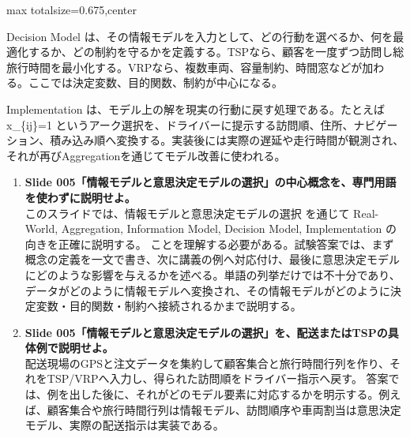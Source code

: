 \begin{adjustbox}{max totalsize={\textwidth}{0.675\textheight},center}
\begin{minipage}{\textwidth}
\begin{minipage}[t]{0.485\textwidth}
Decision Model は、その情報モデルを入力として、どの行動を選べるか、何を最適化するか、どの制約を守るかを定義する。TSPなら、顧客を一度ずつ訪問し総旅行時間を最小化する。VRPなら、複数車両、容量制約、時間窓などが加わる。ここでは決定変数、目的関数、制約が中心になる。\par
Implementation は、モデル上の解を現実の行動に戻す処理である。たとえば x\_\{ij\}=1 というアーク選択を、ドライバーに提示する訪問順、住所、ナビゲーション、積み込み順へ変換する。実装後には実際の遅延や走行時間が観測され、それが再びAggregationを通じてモデル改善に使われる。\par
{}
\begin{enumerate}
\item \textbf{Slide 005「情報モデルと意思決定モデルの選択」の中心概念を、専門用語を使わずに説明せよ。}\\このスライドでは、情報モデルと意思決定モデルの選択 を通じて Real-World, Aggregation, Information Model, Decision Model, Implementation の向きを正確に説明する。 ことを理解する必要がある。試験答案では、まず概念の定義を一文で書き、次に講義の例へ対応付け、最後に意思決定モデルにどのような影響を与えるかを述べる。単語の列挙だけでは不十分であり、データがどのように情報モデルへ変換され、その情報モデルがどのように決定変数・目的関数・制約へ接続されるかまで説明する。
\item \textbf{Slide 005「情報モデルと意思決定モデルの選択」を、配送またはTSPの具体例で説明せよ。}\\配送現場のGPSと注文データを集約して顧客集合と旅行時間行列を作り、それをTSP/VRPへ入力し、得られた訪問順をドライバー指示へ戻す。 答案では、例を出した後に、それがどのモデル要素に対応するかを明示する。例えば、顧客集合や旅行時間行列は情報モデル、訪問順序や車両割当は意思決定モデル、実際の配送指示は実装である。
\end{enumerate}
\end{minipage}
\end{minipage}
\end{adjustbox}

